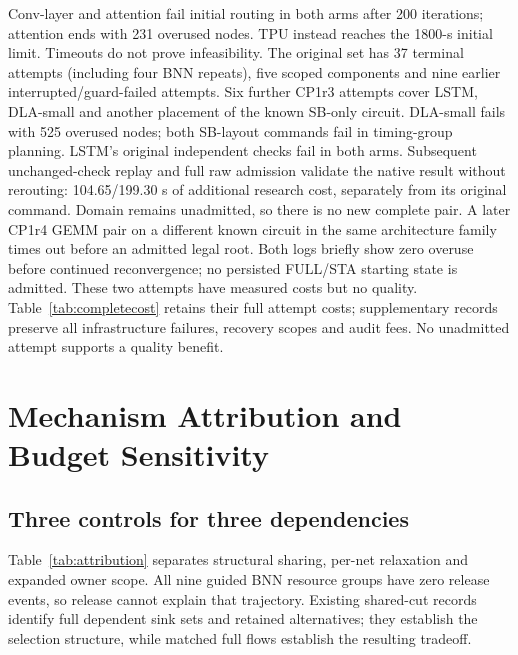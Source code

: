 \documentclass[conference,10pt]{IEEEtran}
\begin{document}
Conv-layer and attention fail initial routing in both arms after 200 iterations; attention ends with 231 overused nodes. TPU instead reaches the 1800-s initial limit. Timeouts do not prove infeasibility. The original set has 37 terminal attempts (including four BNN repeats), five scoped components and nine earlier interrupted/guard-failed attempts. Six further CP1r3 attempts cover LSTM, DLA-small and another placement of the known SB-only circuit. DLA-small fails with 525 overused nodes; both SB-layout commands fail in timing-group planning. LSTM's original independent checks fail in both arms. Subsequent unchanged-check replay and full raw admission validate the native result without rerouting: 104.65/199.30 s of additional research cost, separately from its original command. Domain remains unadmitted, so there is no new complete pair. A later CP1r4 GEMM pair on a different known circuit in the same architecture family times out before an admitted legal root. Both logs briefly show zero overuse before continued reconvergence; no persisted FULL/STA starting state is admitted. These two attempts have measured costs but no quality. Table~\ref{tab:completecost} retains their full attempt costs; supplementary records preserve all infrastructure failures, recovery scopes and audit fees. No unadmitted attempt supports a quality benefit.

\section{Mechanism Attribution and Budget Sensitivity}
\subsection{Three controls for three dependencies}
Table~\ref{tab:attribution} separates structural sharing, per-net relaxation and expanded owner scope. All nine guided BNN resource groups have zero release events, so release cannot explain that trajectory. Existing shared-cut records identify full dependent sink sets and retained alternatives; they establish the selection structure, while matched full flows establish the resulting tradeoff.
\end{document}
